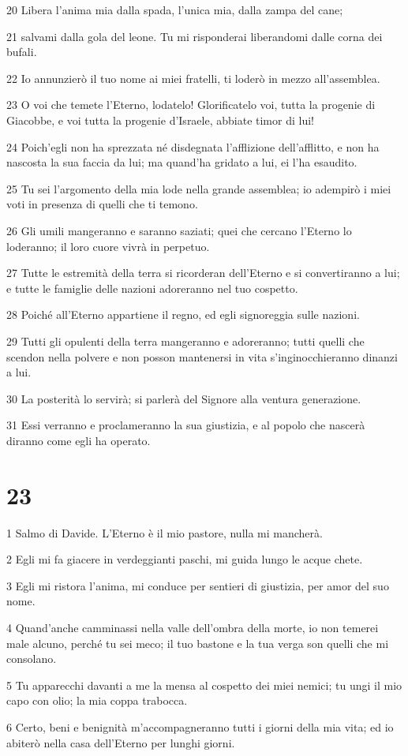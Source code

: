 \par 20 Libera l'anima mia dalla spada, l'unica mia, dalla zampa del cane;
\par 21 salvami dalla gola del leone. Tu mi risponderai liberandomi dalle corna dei bufali.
\par 22 Io annunzierò il tuo nome ai miei fratelli, ti loderò in mezzo all'assemblea.
\par 23 O voi che temete l'Eterno, lodatelo! Glorificatelo voi, tutta la progenie di Giacobbe, e voi tutta la progenie d'Israele, abbiate timor di lui!
\par 24 Poich'egli non ha sprezzata né disdegnata l'afflizione dell'afflitto, e non ha nascosta la sua faccia da lui; ma quand'ha gridato a lui, ei l'ha esaudito.
\par 25 Tu sei l'argomento della mia lode nella grande assemblea; io adempirò i miei voti in presenza di quelli che ti temono.
\par 26 Gli umili mangeranno e saranno saziati; quei che cercano l'Eterno lo loderanno; il loro cuore vivrà in perpetuo.
\par 27 Tutte le estremità della terra si ricorderan dell'Eterno e si convertiranno a lui; e tutte le famiglie delle nazioni adoreranno nel tuo cospetto.
\par 28 Poiché all'Eterno appartiene il regno, ed egli signoreggia sulle nazioni.
\par 29 Tutti gli opulenti della terra mangeranno e adoreranno; tutti quelli che scendon nella polvere e non posson mantenersi in vita s'inginocchieranno dinanzi a lui.
\par 30 La posterità lo servirà; si parlerà del Signore alla ventura generazione.
\par 31 Essi verranno e proclameranno la sua giustizia, e al popolo che nascerà diranno come egli ha operato.

\chapter{23}

\par 1 Salmo di Davide. L'Eterno è il mio pastore, nulla mi mancherà.
\par 2 Egli mi fa giacere in verdeggianti paschi, mi guida lungo le acque chete.
\par 3 Egli mi ristora l'anima, mi conduce per sentieri di giustizia, per amor del suo nome.
\par 4 Quand'anche camminassi nella valle dell'ombra della morte, io non temerei male alcuno, perché tu sei meco; il tuo bastone e la tua verga son quelli che mi consolano.
\par 5 Tu apparecchi davanti a me la mensa al cospetto dei miei nemici; tu ungi il mio capo con olio; la mia coppa trabocca.
\par 6 Certo, beni e benignità m'accompagneranno tutti i giorni della mia vita; ed io abiterò nella casa dell'Eterno per lunghi giorni.

